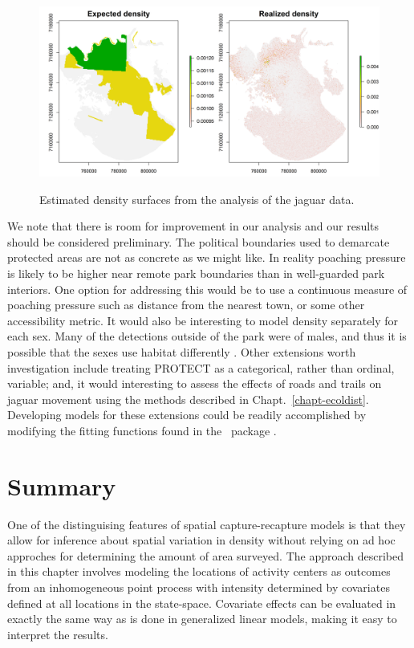 \begin{figure}%
\centering
\includegraphics[width=\textwidth]{Ch11/figs/reD}
\label{state-space.fig.Dsurface}
\caption{Estimated density surfaces from the analysis of the jaguar data.}
\end{figure}

We note that there is room for improvement in our analysis and our
results should be considered preliminary. The
political boundaries used to demarcate protected areas are not as
concrete as we might like. In reality poaching pressure is likely to
be higher near remote park boundaries than in well-guarded park
interiors. One option for addressing this would be to use a continuous
measure of poaching pressure such as distance from the nearest town,
or some other accessibility metric. It would also be interesting to
model density separately for each sex. Many of the detections outside
of the park were of males, and thus it is possible that the sexes use
habitat differently \citep{conde_etal:2010}. Other extensions worth
investigation include treating PROTECT as a categorical, rather than
ordinal, variable; and, it would interesting to assess the effects of
roads and trails on jaguar movement using the methods described in
Chapt.~\ref{chapt-ecoldist}. Developing models for these extensions
could be readily accomplished by modifying the fitting functions found
in the \R~package \scrbook.



\section{Summary}

One of the distinguising features of spatial capture-recapture models
is that they allow for inference about spatial variation
in density without relying on ad hoc approches for determining the
amount of area surveyed. The approach described
in this chapter involves modeling the locations of activity centers as outcomes
from an inhomogeneous point process with intensity determined by
covariates defined at all locations in the state-space. Covariate
effects can be evaluated in exactly the same way as is done in
generalized linear models, making it easy to interpret the results.

